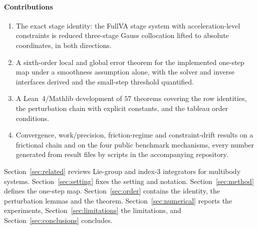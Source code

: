 \paragraph{Contributions}
\begin{enumerate}
  \item The exact stage identity: the FullVA stage system with acceleration-level constraints is
  reduced three-stage Gauss collocation lifted to absolute coordinates, in both directions.
  \item A sixth-order local and global error theorem for the implemented one-step map under a
  smoothness assumption alone, with the solver and inverse interfaces derived and the small-step
  threshold quantified.
  \item A Lean~4/Mathlib development of $57$ theorems covering the row identities, the perturbation
  chain with explicit constants, and the tableau order conditions.
  \item Convergence, work/precision, friction-regime and constraint-drift results on a frictional
  chain and on the four public benchmark mechanisms, every number generated from result files by
  scripts in the accompanying repository.
\end{enumerate}

Section~\ref{sec:related} reviews Lie-group and index-3 integrators for multibody systems.
Section~\ref{sec:setting} fixes the setting and notation. Section~\ref{sec:method} defines the
one-step map. Section~\ref{sec:order} contains the identity, the perturbation lemmas and the
theorem. Section~\ref{sec:numerical} reports the experiments, Section~\ref{sec:limitations} the
limitations, and Section~\ref{sec:conclusions} concludes.
